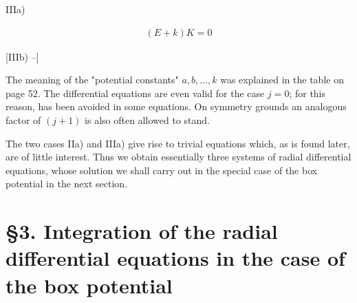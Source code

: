 \documentclass{article}
\newcommand{\uequ}[1]{
\begin{align*}
#1
\end{align*}
}
\begin{document}
IIIa)
\uequ{
(E+k)K = 0
}

[IIIb) --]

The meaning of the "potential constants" $a,b,\dots,k$ was explained in the table on page 52. The differential equations are even valid for the case $j=0$; for this reason,  has been avoided in some equations. On symmetry grounds an analogous factor of $(j+1)$ is also often allowed to stand.

The two cases IIa) and IIIa) give rise to trivial equations which, as is found later, are of little interest. Thus we obtain essentially three systems of radial differential equations, whose solution we shall carry out in the special case of the box potential in the next section.

\section*{§3. Integration of the radial differential equations in the case of the box potential}


 
\end{document}
